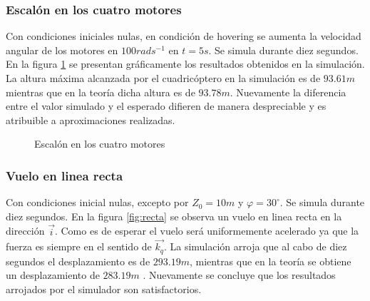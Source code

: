 \documentclass[main]{subfiles}
\begin{document}
\subsubsection{Escal\'on en los cuatro motores}
Con condiciones iniciales nulas, en condici\'on de hovering se aumenta la velocidad angular de los motores en $100 rads^{-1}$ en $t=5s$. Se simula durante diez segundos. En la figura \ref{fig:escalon} se presentan gr\'aficamente los resultados obtenidos en la simulaci\'on. La altura m\'axima alcanzada por el cuadric\'optero en la simulaci\'on es de $93.61m$ mientras que en la teor\'ia dicha altura es de $93.78m$. Nuevamente la diferencia entre el valor simulado y el esperado difieren de manera despreciable y es atribuible a aproximaciones realizadas.

\begin{figure} [h!]
  \centering
  \caption{Escal\'on en los cuatro motores}
  \label{fig:escalon}
\end{figure}

\subsubsection*{Vuelo en linea recta}

Con condiciones inicial nulas, excepto por $Z_0 = 10m$ y $\varphi = 30 ^{\circ}$. Se simula durante diez segundos. En la figura \ref{fig:recta} se observa un vuelo en linea recta en la direcci\'on $\vec{i}$. Como es de esperar el vuelo ser\'a uniformemente acelerado ya que la fuerza es siempre en el sentido de $\vec{k_q}$. La simulaci\'on arroja que al cabo de diez segundos el desplazamiento es de $293.19m$, mientras que en la teor\'ia se obtiene un desplazamiento de $283.19m$	. Nuevamente se concluye que los resultados arrojados por el simulador son satisfactorios.\\
\end{document}
